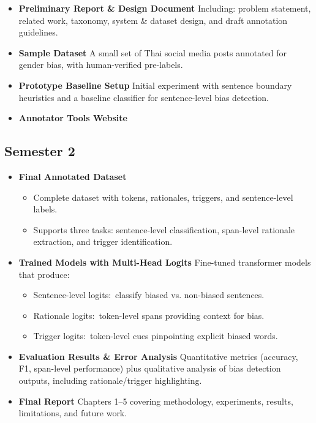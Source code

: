 \documentclass[12pt,oneside,openright,a4paper]{cpe-english-project}
\begin{document}
\begin{itemize}
\item
  {\textbf{Preliminary Report \& Design Document}\hfill\break
  Including: problem statement, related work, taxonomy, system \& dataset design, and draft annotation guidelines.}
\item
  {\textbf{Sample Dataset}\hfill\break
  A small set of Thai social media posts annotated for gender bias, with human-verified pre-labels.}
\item
  {\textbf{Prototype Baseline Setup}\hfill\break
  Initial experiment with sentence boundary heuristics and a baseline classifier for sentence-level bias detection.}
\item
  {\textbf{Annotator Tools Website}}
\end{itemize}

\subsection{Semester 2}

\begin{itemize}
\item
  {\textbf{Final Annotated Dataset}}
  \begin{itemize}
  \item
    {Complete dataset with tokens, rationales, triggers, and sentence-level labels.}
  \item
    {Supports three tasks: sentence-level classification, span-level rationale extraction, and trigger identification.}
  \end{itemize}
\item
  {\textbf{Trained Models with Multi-Head Logits}\hfill\break
  Fine-tuned transformer models that produce:}
  \begin{itemize}
  \item
    {Sentence-level logits:~classify biased vs. non-biased sentences.}
  \item
    {Rationale logits:~token-level spans providing context for bias.}
  \item
    {Trigger logits:~token-level cues pinpointing explicit biased words.}
  \end{itemize}
\item
  {\textbf{Evaluation Results \& Error Analysis}\hfill\break
  Quantitative metrics (accuracy, F1, span-level performance) plus qualitative analysis of bias detection outputs, including rationale/trigger highlighting.}
\item
  {\textbf{Final Report}\hfill\break
  Chapters 1--5 covering methodology, experiments, results, limitations, and future work.}
\end{itemize}
\end{document}
